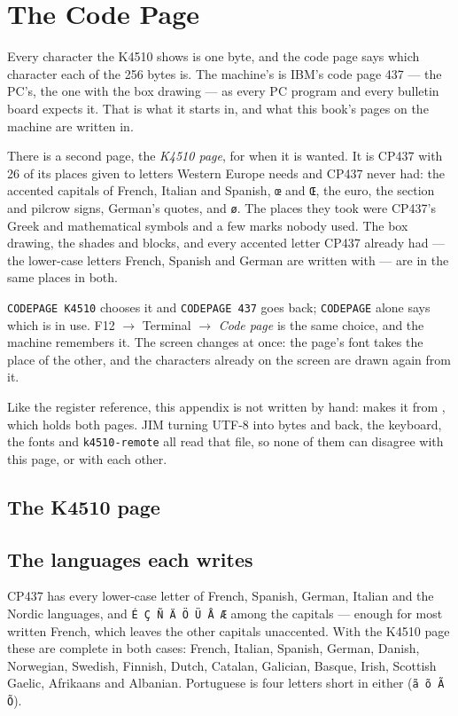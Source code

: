 \chapter{The Code Page}\label{cha:codepage}

Every character the K4510 shows is one byte, and the code page says which
character each of the 256 bytes is. The machine's is IBM's code page 437
--- the PC's, the one with the box drawing --- as every PC program and
every bulletin board expects it. That is what it starts in, and what this
book's pages on the machine are written in.

There is a second page, the \emph{K4510 page}, for when it is wanted. It
is CP437 with 26 of its places given to letters Western Europe needs and
CP437 never had: the accented capitals of French, Italian and Spanish,
\texttt{œ} and \texttt{Œ}, the euro, the section and pilcrow signs,
German's quotes, and \texttt{ø}. The places they took were CP437's Greek
and mathematical symbols and a few marks nobody used. The box drawing, the
shades and blocks, and every accented letter CP437 already had --- the
lower-case letters French, Spanish and German are written with --- are in
the same places in both.

\verb|CODEPAGE K4510| chooses it and \verb|CODEPAGE 437| goes back;
\verb|CODEPAGE| alone says which is in use. F12 $\rightarrow$ Terminal
$\rightarrow$ \emph{Code page} is the same choice, and the machine
remembers it. The screen changes at once: the page's font takes the
place of the other, and the characters already on the screen are drawn
again from it.

Like the register reference, this appendix is not written by hand:
 makes it from , which
holds both pages. JIM turning UTF-8 into bytes and back, the keyboard, the
fonts and \texttt{k4510-remote} all read that file, so none of them can
disagree with this page, or with each other.

\section{The K4510 page}


\section{The languages each writes}
CP437 has every lower-case letter of French, Spanish, German, Italian and
the Nordic languages, and \texttt{É Ç Ñ Ä Ö Ü Å Æ} among the capitals ---
enough for most written French, which leaves the other capitals
unaccented. With the K4510 page these are complete in both cases: French,
Italian, Spanish, German, Danish, Norwegian, Swedish, Finnish, Dutch,
Catalan, Galician, Basque, Irish, Scottish Gaelic, Afrikaans and
Albanian. Portuguese is four letters short in either (\texttt{ã õ Ã Õ}).

